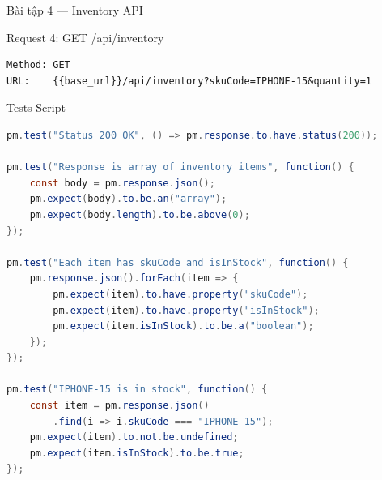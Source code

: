 \documentclass[aspectratio=169,10pt]{beamer}
\begin{document}
\begin{frame}[fragile]{Bài tập 4 --- Inventory API}
  \begin{block}{Request 4: GET /api/inventory}
\begin{lstlisting}[style=json,language={}]
Method: GET
URL:    {{base_url}}/api/inventory?skuCode=IPHONE-15&quantity=1
\end{lstlisting}
  \end{block}

  \begin{block}{Tests Script}
\begin{lstlisting}[language=Java,style=nonumber]
pm.test("Status 200 OK", () => pm.response.to.have.status(200));

pm.test("Response is array of inventory items", function() {
    const body = pm.response.json();
    pm.expect(body).to.be.an("array");
    pm.expect(body.length).to.be.above(0);
});

pm.test("Each item has skuCode and isInStock", function() {
    pm.response.json().forEach(item => {
        pm.expect(item).to.have.property("skuCode");
        pm.expect(item).to.have.property("isInStock");
        pm.expect(item.isInStock).to.be.a("boolean");
    });
});

pm.test("IPHONE-15 is in stock", function() {
    const item = pm.response.json()
        .find(i => i.skuCode === "IPHONE-15");
    pm.expect(item).to.not.be.undefined;
    pm.expect(item.isInStock).to.be.true;
});
\end{lstlisting}
  \end{block}
\end{frame}
\end{document}
